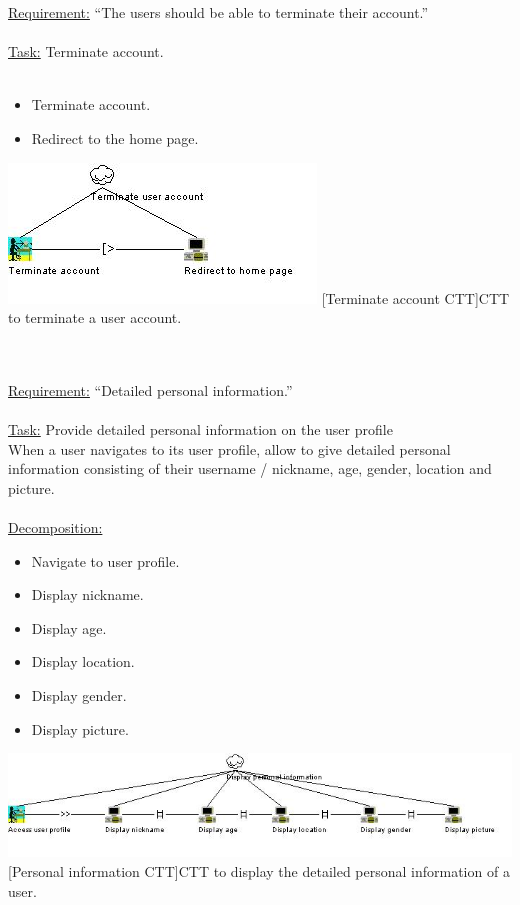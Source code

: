 \documentclass[11pt, a4paper,svglistings,oneside]{book}
\begin{document}
\underline{Requirement:} ``The users should be able to terminate their account.'' \\ \\
\underline{Task:} Terminate account. \\ \\
\begin{itemize}
\item Terminate account.
\item Redirect to the home page.
\end{itemize}
\noindent\begin{minipage}{\textwidth}
    \centering
   \includegraphics{CTT_Terminate.png}
 [Terminate account CTT]{CTT to terminate a user account.}
\end{minipage}
$\;$ \\ \\
\underline{Requirement:} ``Detailed personal information.'' \\ \\
\underline{Task:} Provide detailed personal information on the user profile \\
When a user navigates to its user profile, allow to give detailed personal information consisting of their username / nickname, age, gender, location and picture. \\ \\
\underline{Decomposition:}
\begin{itemize}
\item Navigate to user profile.
\item Display nickname.
\item Display age.
\item Display location.
\item Display gender.
\item Display picture.
\end{itemize}
\noindent\begin{minipage}{\textwidth}
    \centering
   \includegraphics[width=\textwidth]{CTT_Personal.png}
 [Personal information CTT]{CTT to display the detailed personal information of a user.}
\end{minipage}
\end{document}
